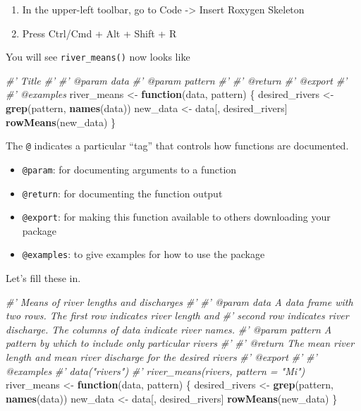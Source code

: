 \documentclass[
]{book}
\newenvironment{Shaded}{\begin{snugshade}}{\end{snugshade}}
\newcommand{\CommentTok}[1]{\textcolor[rgb]{0.56,0.35,0.01}{\textit{#1}}}
\newcommand{\ControlFlowTok}[1]{\textcolor[rgb]{0.13,0.29,0.53}{\textbf{#1}}}
\newcommand{\KeywordTok}[1]{\textcolor[rgb]{0.13,0.29,0.53}{\textbf{#1}}}
\newcommand{\NormalTok}[1]{#1}
\newcommand{\StringTok}[1]{\textcolor[rgb]{0.31,0.60,0.02}{#1}}
\providecommand{\tightlist}{%
  \setlength{\itemsep}{0pt}\setlength{\parskip}{0pt}}
\begin{document}
\begin{enumerate}
\def\labelenumi{\arabic{enumi}.}
\tightlist
\item
  In the upper-left toolbar, go to Code -\textgreater{} Insert Roxygen Skeleton
\item
  Press Ctrl/Cmd + Alt + Shift + R
\end{enumerate}

You will see \texttt{river\_means()} now looks like

\begin{Shaded}
\begin{Highlighting}[]
\CommentTok{#' Title}
\CommentTok{#'}
\CommentTok{#' @param data }
\CommentTok{#' @param pattern }
\CommentTok{#'}
\CommentTok{#' @return}
\CommentTok{#' @export}
\CommentTok{#'}
\CommentTok{#' @examples}
\NormalTok{river_means <-}\StringTok{ }\ControlFlowTok{function}\NormalTok{(data, pattern) \{}
\NormalTok{  desired_rivers <-}\StringTok{ }\KeywordTok{grep}\NormalTok{(pattern, }\KeywordTok{names}\NormalTok{(data))}
\NormalTok{  new_data <-}\StringTok{ }\NormalTok{data[, desired_rivers]}
  \KeywordTok{rowMeans}\NormalTok{(new_data)}
\NormalTok{\}}
\end{Highlighting}
\end{Shaded}

The \texttt{@} indicates a particular ``tag'' that controls how functions are documented.

\begin{itemize}
\tightlist
\item
  \texttt{@param}: for documenting arguments to a function
\item
  \texttt{@return}: for documenting the function output
\item
  \texttt{@export}: for making this function available to others downloading your package
\item
  \texttt{@examples}: to give examples for how to use the package
\end{itemize}

Let's fill these in.

\begin{Shaded}
\begin{Highlighting}[]
\CommentTok{#' Means of river lengths and discharges}
\CommentTok{#'}
\CommentTok{#' @param data A data frame with two rows. The first row indicates river length and}
\CommentTok{#'   second row indicates river discharge. The columns of data indicate river names.}
\CommentTok{#' @param pattern A pattern by which to include only particular rivers}
\CommentTok{#'}
\CommentTok{#' @return The mean river length and mean river discharge for the desired rivers}
\CommentTok{#' @export}
\CommentTok{#'}
\CommentTok{#' @examples}
\CommentTok{#' data("rivers")}
\CommentTok{#' river_means(rivers, pattern = "Mi")}
\NormalTok{river_means <-}\StringTok{ }\ControlFlowTok{function}\NormalTok{(data, pattern) \{}
\NormalTok{  desired_rivers <-}\StringTok{ }\KeywordTok{grep}\NormalTok{(pattern, }\KeywordTok{names}\NormalTok{(data))}
\NormalTok{  new_data <-}\StringTok{ }\NormalTok{data[, desired_rivers]}
  \KeywordTok{rowMeans}\NormalTok{(new_data)}
\NormalTok{\}}
\end{Highlighting}
\end{Shaded}
\end{document}
